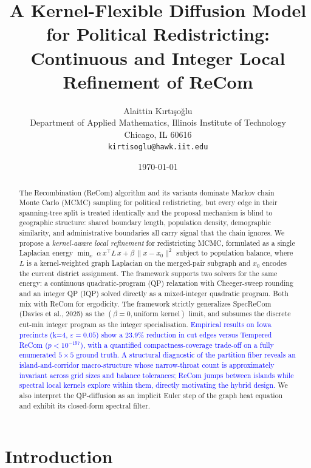 \documentclass[11pt]{article}
\title{A Kernel-Flexible Diffusion Model for Political Redistricting:\\
       Continuous and Integer Local Refinement of ReCom}
\author{Alaittin K\i rt\i \c{s}o\u{g}lu \\
        \small Department of Applied Mathematics, Illinois Institute of Technology \\
        \small Chicago, IL 60616 \\
        \small \texttt{kirtisoglu@hawk.iit.edu}}
\date{\today}
\newcommand{\draft}[1]{\textcolor{blue}{#1}}
\begin{document}
\maketitle

\begin{abstract}
The Recombination (ReCom) algorithm and its variants dominate Markov chain
Monte Carlo (MCMC) sampling for political redistricting, but every
edge in their spanning-tree split is treated identically and the
proposal mechanism is blind to geographic structure: shared boundary
length, population density, demographic similarity, and administrative
boundaries all carry signal that the chain ignores. We propose a
\emph{kernel-aware local refinement} for redistricting MCMC, formulated
as a single Laplacian energy
\(
  \min_{x}\; \alpha\, x^\top L\, x + \beta\, \|x - x_0\|^2
\)
subject to population balance, where $L$ is a kernel-weighted graph
Laplacian on the merged-pair subgraph and $x_0$ encodes the current
district assignment. The framework supports two solvers for the same
energy: a continuous quadratic-program (QP) relaxation with
Cheeger-sweep rounding and an integer QP (IQP) solved directly as a
mixed-integer quadratic program. Both mix with ReCom for ergodicity.
The framework strictly generalizes SpecReCom (Davies et al., 2025) as
the $(\beta = 0, \text{uniform kernel})$ limit, and subsumes the
discrete cut-min integer program as the integer specialisation.
\draft{Empirical results on Iowa precincts (k=4, $\varepsilon = 0.05$)
show a 23.9\% reduction in cut edges versus Tempered ReCom
($p < 10^{-197}$), with a quantified compactness-coverage trade-off on
a fully enumerated $5 \times 5$ ground truth. A structural diagnostic
of the partition fiber reveals an island-and-corridor macro-structure
whose narrow-throat count is approximately invariant across grid sizes
and balance tolerances; ReCom jumps between islands while spectral local
kernels explore within them, directly motivating the hybrid design.} We
also interpret the QP-diffusion as an implicit Euler step of the graph
heat equation and exhibit its closed-form spectral filter.
\end{abstract}

\tableofcontents
\newpage

\section{Introduction}\label{sec:intro}
\end{document}
